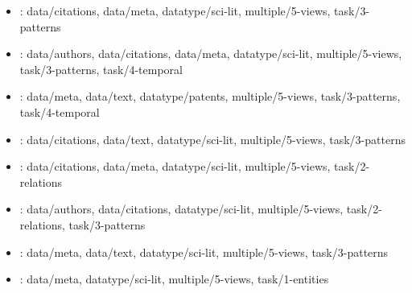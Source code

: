 \begin {refsection}
\begin {itemize}
\item \cite {kampanya-2004-citiviz:-a-visual-user-interface-to-the-citidel}:
    data/citations, data/meta, datatype/sci-lit, multiple/5-views, task/3-patterns


\item \cite {lee-2009-facetlens:-exposing-trends-and-relationships-to-support}:
    data/authors, data/citations, data/meta, datatype/sci-lit, multiple/5-views, task/3-patterns, task/4-temporal


\item \cite {spangler-2010-simple:-interactive-analytics-on-patent-data}:
    data/meta, data/text, datatype/patents, multiple/5-views, task/3-patterns, task/4-temporal


\item \cite {chen-1999-visualising-semantic-spaces-and-author-co-citation}:
    data/citations, data/text, datatype/sci-lit, multiple/5-views, task/3-patterns


\item \cite {chou-2011-papervis:-literature-review-made-easy}:
    data/citations, data/meta, datatype/sci-lit, multiple/5-views, task/2-relations


\item \cite {ke-2004-major-information-visualization-authors-papers}:
    data/authors, data/citations, datatype/sci-lit, multiple/5-views, task/2-relations, task/3-patterns


\item \cite {white-2004-user-controlled-mapping-of-significant-literatures}:
    data/meta, data/text, datatype/sci-lit, multiple/5-views, task/3-patterns


\item \cite {nazemi-2013-adaptive-semantic-visualization-for-bibliographic-entries}:
    data/meta, datatype/sci-lit, multiple/5-views, task/1-entities


\end {itemize}
\printbibliography
\end {refsection}\pagebreak

